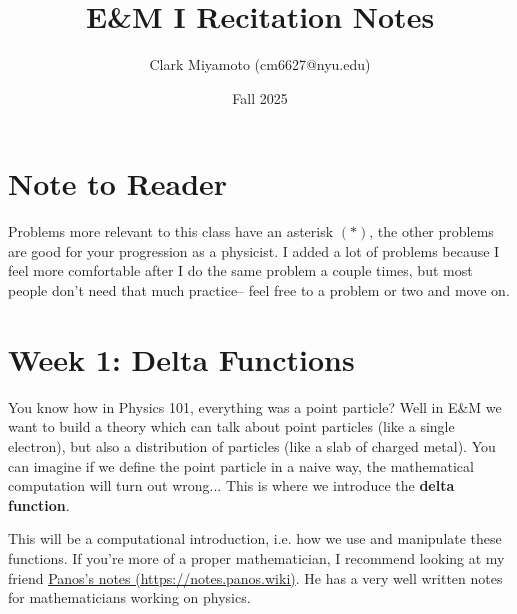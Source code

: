 \documentclass[12pt,fleqn]{article}
\title{E\&M I Recitation Notes}
\author{Clark Miyamoto (cm6627@nyu.edu)}
\date{Fall 2025}
\numberwithin{equation}{section} %
\newcounter{problem}
\begin{document}
\maketitle



\tableofcontents

\section{Note to Reader}
Problems more relevant to this class have an asterisk $(*)$, the other problems are good for your progression as a physicist. I added a lot of problems because I feel more comfortable after I do the same problem a couple times, but most people don't need that much practice-- feel free to a problem or two and move on.

\newpage
\section{Week 1: Delta Functions}
You know how in Physics 101, everything was a point particle? Well in E\&M we want to build a theory which can talk about point particles (like a single electron), but also a distribution of particles (like a slab of charged metal). You can imagine if we define the point particle in a naive way, the mathematical computation will turn out wrong... This is where we introduce the \textbf{delta function}.
\begin{sidework}
	This will be a computational introduction, i.e. how we use and manipulate these functions. If you're more of a proper mathematician, I recommend looking at my friend \href{https://notes.panos.wiki/Analysis+Distributions}{Panos's notes (https://notes.panos.wiki)}. He has a very well written notes for mathematicians working on physics.
\end{sidework}
\end{document}
